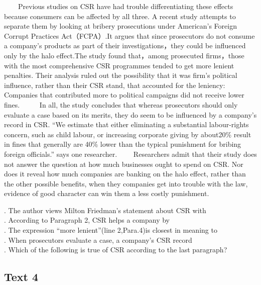 　　Previous studies on CSR have had trouble differentiating these effects because consumers can be affected by all three. A recent study attempts to separate them by looking at bribery prosecutions under American’s Foreign Corrupt Practices Act（FCPA）.It argues that since prosecutors do not consume a company’s products as part of their investigations，they could be influenced only by the halo effect.The study found that，among prosecuted firms，those with the most comprehensive CSR programmes tended to get more lenient penalties. Their analysis ruled out the possibility that it was firm’s political influence, rather than their CSR stand, that accounted for the leniency: Companies that contributed more to political campaigns did not receive lower fines. 
　　In all, the study concludes that whereas prosecutors should only evaluate a case based on its merits, they do seem to be influenced by a company’s record in CSR. “We estimate that either eliminating a substantial labour-rights concern, such as child labour, or increasing corporate giving by about20\% result in fines that generally are 40\% lower than the typical punishment for bribing foreign officials.” says one researcher.
　　Researchers admit that their study does not answer the question at how much businesses ought to spend on CSR. Nor does it reveal how much companies are banking on the halo effect, rather than the other possible benefits, when they companies get into trouble with the law, evidence of good character can win them a less costly punishment.
 
　\begin{questions} . The author views Milton Friedman’s statement about CSR with
　　\\ . According to Paragraph 2, CSR helps a company by
　　\\ . The expression “more lenient”(line 2,Para.4)is closest in meaning to
　　\\ . When prosecutors evaluate a case, a company’s CSR record
　　\\ . Which of the following is true of CSR according to the last paragraph?
　　\\ \end{questions}      \subsection{Text 4}
